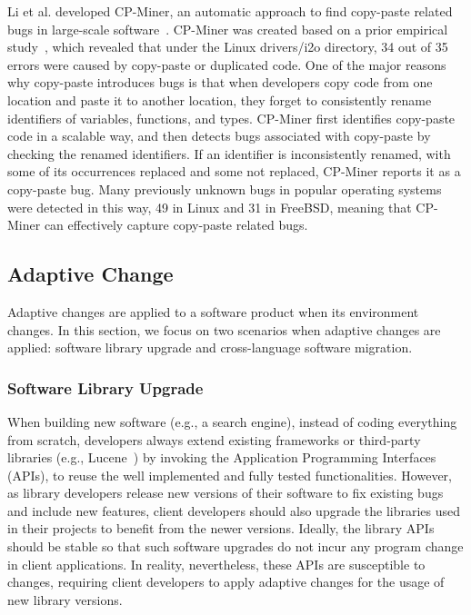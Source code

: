 \documentclass[runningheads,a4paper]{llncs}
\begin{document}
Li et al. developed CP-Miner, an automatic approach to find copy-paste related bugs in large-scale software~\cite{Li2006:CPMiner}. CP-Miner was created based on a prior empirical study~\cite{Chou2001:ESO}, which revealed that under the Linux {\sf drivers/i2o} directory, 34 out of 35 errors were caused by copy-paste or duplicated code. 
One of the major reasons why copy-paste introduces bugs is that when developers copy code from one location and paste it to another location, they forget to consistently rename identifiers of variables, functions, and types. CP-Miner first identifies copy-paste code in a scalable way, and then detects bugs associated with copy-paste by checking the renamed identifiers. If an identifier is inconsistently renamed, with some of its occurrences replaced and some not replaced, CP-Miner reports it as a copy-paste bug. Many previously unknown bugs in popular operating systems were detected in this way, 49 in Linux and 31 in FreeBSD, meaning that CP-Miner can effectively capture copy-paste related bugs. 
 
\subsection{Adaptive Change}
\label{sec:adaptive}
Adaptive changes are applied to a software product when its environment changes. In this section, we focus on two scenarios when adaptive changes are applied: software library upgrade and cross-language software migration.

\subsubsection{Software Library Upgrade} 
When building new software (e.g., a search engine), instead of coding everything from scratch, developers always extend existing frameworks or third-party libraries (e.g., Lucene~\cite{lucene}) by invoking the Application Programming Interfaces (APIs), to reuse the well implemented and fully tested functionalities. However, as library developers release new versions of their software to fix existing bugs and include new features, client developers should also upgrade the libraries used in their projects to benefit from the newer versions. Ideally, the library APIs should be stable so that such software upgrades do not incur any program change in client applications. In reality, nevertheless, these APIs are susceptible to changes, requiring client developers to apply adaptive changes for the usage of new library versions. 
\end{document}
